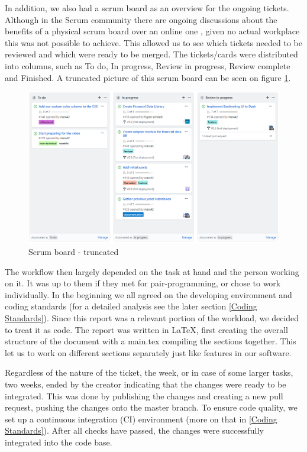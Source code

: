 In addition, we also had a scrum board as an overview for the ongoing tickets. Although in the Scrum community there are ongoing discussions about the benefits of a physical scrum board over an online one \cite{physicalscrum}, given no actual workplace this was not possible to achieve. This allowed us to see which tickets needed to be reviewed and which were ready to be merged. The tickets/cards were distributed into columns, such as To do, In progress, Review in progress, Review complete and Finished. A truncated picture of this scrum board can be seen on figure \figurename{\ref{Scrum}}.

\begin{figure}[H]
   \centering
   \includegraphics[width=\textwidth]{06Coding/05Pictures/scrumboard.png}
   \caption{Scrum board - truncated}
   \label{Scrum}
\end{figure}

The workflow then largely depended on the task at hand and the person working on it. It was up to them if they met for pair-programming, or chose to work individually. In the beginning we all agreed on the developing environment and coding standards (for a detailed analysis see the later section \ref{Coding Standards}). Since this report was a relevant portion of the workload, we decided to treat it as code. The report was written in \LaTeX, first creating the overall structure of the document with a main.tex compiling the sections together. This let us to work on different sections separately just like features in our software.

Regardless of the nature of the ticket, the week, or in case of some larger tasks, two weeks, ended by the creator indicating that the changes were ready to be integrated. This was done by publishing the changes and creating a new pull request, pushing the changes onto the master branch. To ensure code quality, we set up a continuous integration (CI) environment (more on that in \ref{Coding Standards}). After all checks have passed, the changes were successfully integrated into the code base.

